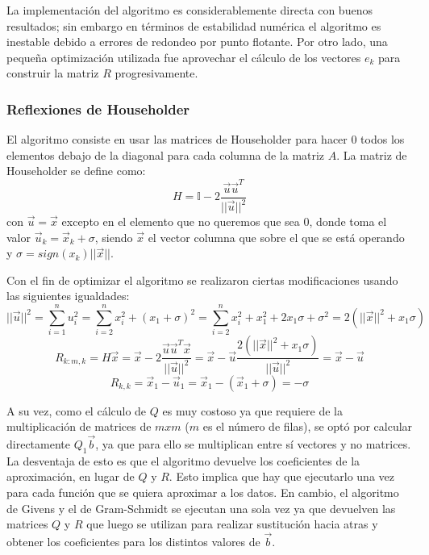 \documentclass[journal, monochrome]{IEEEtran}
\begin{document}
La implementación del algoritmo es considerablemente directa con buenos resultados; sin embargo en términos de estabilidad numérica el algoritmo es inestable debido a errores de redondeo por punto flotante. 
Por otro lado, una pequeña optimización utilizada fue aprovechar el cálculo de los vectores $e_k$ para construir la matriz $R$ progresivamente.

\vspace{0.5cm}
\subsubsection{Reflexiones de Householder}
\par
El algoritmo consiste en usar las matrices de Householder para hacer 0 todos los elementos debajo de la diagonal para cada columna de la matriz $A$. La matriz de Householder se define como:
\begin{equation}
H = \mathbb{I} - 2\frac{\vec{u}\vec{u}^{T}}{||\vec{u}||^{2}}
\label{equation:householder}
\end{equation}
con $\vec{u} = \vec{x}$ excepto en el elemento que no queremos que sea 0, donde toma el valor $\vec{u}_{k} = \vec{x}_{k} + \sigma$, siendo $\vec{x}$ el vector columna que sobre el que se está operando y $\sigma = sign(x_{k})||\vec{x}||$.
\par
Con el fin de optimizar el algoritmo se realizaron ciertas modificaciones usando las siguientes igualdades:
\begin{equation}
||\vec{u}||^{2} = \sum_{i=1}^{n} u_{i}^{2} = \sum_{i=2}^{n} x_{i}^{2} + (x_{1}+\sigma)^{2}
 = \sum_{i=2}^{n} x_{i}^{2} + x_{1}^{2} + 2x_{1}\sigma + \sigma^{2} = 2(||\vec{x}||^{2} + x_{1}\sigma)
\end{equation}
\begin{equation}
R_{k:m,k} = H\vec{x} = \vec{x} - 2\frac{\vec{u}\vec{u}^{T}\vec{x}}{||\vec{u}||^{2}} = \vec{x} - \vec{u}\frac{2(||\vec{x}||^{2}+x_{1}\sigma)}{||\vec{u}||^{2}} = \vec{x} - \vec{u}
\end{equation}
\begin{equation}
R_{k,k} = \vec{x}_{1} - \vec{u}_{1} = \vec{x}_{1} - (\vec{x}_{1} + \sigma) = -\sigma
\end{equation}
\par
A su vez, como el cálculo de $Q$ es muy costoso ya que requiere de la multiplicación de matrices de $mxm$ ($m$ es el número de filas), se optó por calcular directamente $Q_{1}\vec{b}$, ya que para ello se multiplican entre sí vectores y no matrices. La desventaja de esto es que el algoritmo devuelve los coeficientes de la aproximación, en lugar de $Q$ y $R$. Esto implica que hay que ejecutarlo una vez para cada función que se quiera aproximar a los datos. En cambio, el algoritmo de Givens y el de Gram-Schmidt se ejecutan una sola vez ya que devuelven las matrices $Q$ y $R$ que luego se utilizan para realizar sustitución hacia atras y obtener los coeficientes para los distintos valores de $\vec{b}$.
\end{document}
